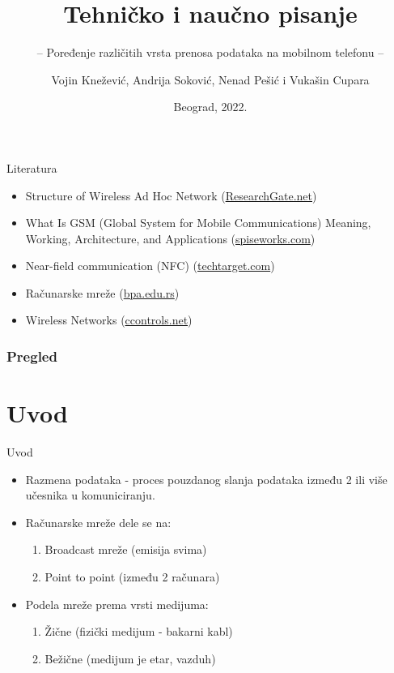 \documentclass{beamer}
\title{Tehničko i naučno pisanje}
\subtitle{-- Poređenje različitih vrsta prenosa podataka na mobilnom telefonu --}
\author{Vojin Knežević, Andrija Soković, Nenad Pešić i Vukašin Cupara}
\institute{Matematički fakultet\\Univerzitet u Beogradu}
\date{
	\footnotesize{Beograd, 2022.}	
}
\begin{document}
\begin{frame}
	\thispagestyle{empty}
	\titlepage
\end{frame}

\addtocounter{framenumber}{-1}

\begin{frame}{Literatura}
	\begin{itemize}
		\item Structure of Wireless Ad Hoc Network (\url{ResearchGate.net})
        \item What Is GSM (Global System for Mobile Communications) Meaning, Working, Architecture, and Applications (\url{spiseworks.com})
        \item Near-field communication (NFC) (\url{techtarget.com})
        \item Računarske mreže (\url{bpa.edu.rs})
        \item Wireless Networks (\url{ccontrols.net})
		
	\end{itemize}
\end{frame}

\begin{frame}
	\frametitle{Pregled} 
	\tableofcontents[hidesubsections] 
\end{frame}

\section{Uvod}

\begin{frame}{Uvod}
\begin{itemize}
\item Razmena podataka - proces pouzdanog slanja podataka između 2 ili više učesnika u komuniciranju.\\
\item Računarske mreže dele se na:
\begin{enumerate}
    \item Broadcast mreže (emisija svima)
    \item Point to point (između 2 računara)
\end{enumerate}
\item Podela mreže prema vrsti medijuma:
\begin{enumerate}
    \item Žične (fizički medijum - bakarni kabl)
    \item Bežične (medijum je etar, vazduh)
\end{enumerate}
\end{itemize}
	
\end{frame}
\end{document}
